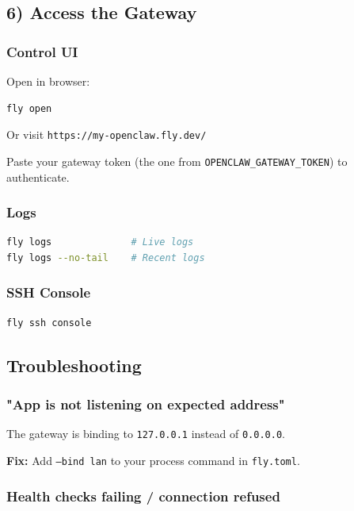 \subsection{6) Access the Gateway}


\subsubsection{Control UI}


Open in browser:

\begin{lstlisting}[language=bash]
fly open
\end{lstlisting}


Or visit \texttt{https://my-openclaw.fly.dev/}

Paste your gateway token (the one from \texttt{OPENCLAW\_GATEWAY\_TOKEN}) to authenticate.

\subsubsection{Logs}


\begin{lstlisting}[language=bash]
fly logs              # Live logs
fly logs --no-tail    # Recent logs
\end{lstlisting}


\subsubsection{SSH Console}


\begin{lstlisting}[language=bash]
fly ssh console
\end{lstlisting}


\subsection{Troubleshooting}


\subsubsection{"App is not listening on expected address"}


The gateway is binding to \texttt{127.0.0.1} instead of \texttt{0.0.0.0}.

\textbf{Fix:} Add \texttt{--bind lan} to your process command in \texttt{fly.toml}.

\subsubsection{Health checks failing / connection refused}


